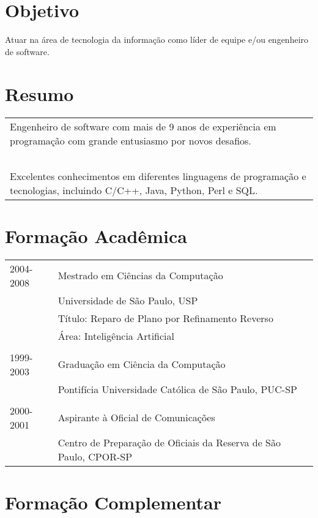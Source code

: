 \documentclass[a4paper, oneside, final]{scrartcl}
\begin{document}
\begin{center}
\textsc{\huge{}}\\ \ \\

\section{Objetivo}
Atuar na área de tecnologia da informação como líder de equipe e/ou engenheiro de software.

\section{Resumo}

\begin{tabularx}{0.97\linewidth}{X}
  Engenheiro de software com mais de 9 anos de experiência em programação com grande entusiasmo por novos desafios. \\ \ \\
  Excelentes conhecimentos em diferentes linguagens de programação e tecnologias, incluindo C/C++, Java, Python, Perl e SQL.
\end{tabularx}

\section{Formação Acadêmica}

\begin{tabularx}{0.97\linewidth}{p{2cm}X}
2004-2008   & Mestrado em Ciências da Computação\\
            & Universidade de São Paulo, USP\\
            & Título: Reparo de Plano por Refinamento Reverso\\
            & Área:  Inteligência Artificial\\ \\

1999-2003   & Graduação em Ciência da Computação\\
            & Pontifícia Universidade Católica de São Paulo, PUC-SP\\ \\

2000-2001   & Aspirante à Oficial de Comunicações\\
            & Centro de Preparação de Oficiais da Reserva de São Paulo, CPOR-SP
\end{tabularx}

\section{Formação Complementar}


\end{center}
\end{document}
